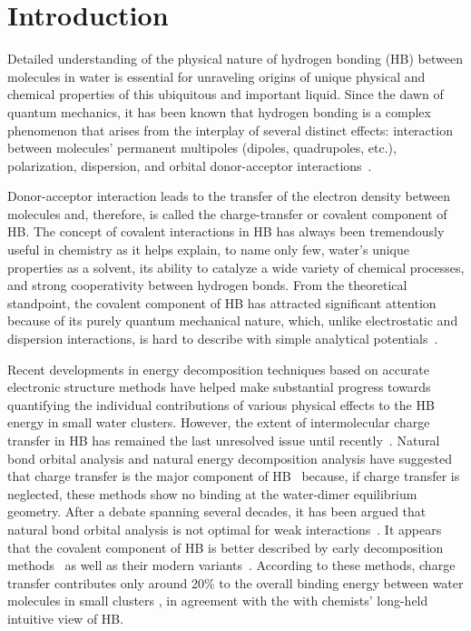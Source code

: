 \documentclass[prl,twocolumn,showpacs]{revtex4}
\begin{document}
\section{Introduction} 

Detailed understanding of the physical nature of hydrogen bonding (HB) between molecules in water is essential for unraveling origins of unique physical and chemical properties of this ubiquitous and important liquid. Since the dawn of quantum mechanics, it has been known that hydrogen bonding is a complex phenomenon that arises from the interplay of several distinct effects: interaction between molecules’ permanent multipoles (dipoles, quadrupoles, etc.), polarization, dispersion, and orbital donor-acceptor interactions~\cite{eisenberg2005structure}. 

Donor-acceptor interaction leads to the transfer of the electron density between molecules and, therefore, is called the charge-transfer or covalent component of HB. The concept of covalent interactions in HB has always been tremendously useful in chemistry 
as it helps explain, to name only few, water's unique properties as a solvent, its ability to catalyze a wide variety of chemical processes, and strong cooperativity between hydrogen bonds. From the theoretical standpoint, the covalent component of HB has attracted significant attention because of its purely quantum mechanical nature, which, unlike electrostatic and dispersion interactions, is hard to describe with simple analytical potentials~\cite{ZZZ}. 


Recent developments in energy decomposition techniques based on accurate electronic structure methods have helped make substantial progress towards quantifying the individual contributions of various physical effects to the HB energy in small water clusters. However, the extent of intermolecular charge transfer in HB has remained the last unresolved issue until recently~\cite{isaacs1999covalency,ghanty2000hydrogen,stone2017natural}. Natural bond orbital analysis\cite{weinhold1998natural} and natural energy decomposition analysis \cite{glendening1994natural} have suggested that charge transfer is the major component of HB~\cite{schenter1996natural,glendening2005natural,weinhold2005resonance} because, if charge transfer is neglected, these methods show no binding at the water-dimer equilibrium geometry. After a debate spanning several decades, it has been argued that natural bond orbital analysis is not optimal for weak interactions~\cite{stone2017natural}. It appears that the covalent component of HB is better described by early decomposition methods~\cite{kitaura1976new,bagus1984new,bagus1992decomposition,stevens1987frozen,chen1996energy,ZZZ-SAPT} as well as their modern variants~\cite{mo2000energy,misquitta2003dispersion,khaliullin2007unravelling}. According to these methods, charge transfer contributes only around 20\% to the overall binding energy between water molecules in small clusters \cite{stevens1987frozen,chen1996energy,piquemal2005csov,khaliullin2009electron,cobar2012examination}, in agreement with the with chemists' long-held intuitive view of HB.
\end{document}
